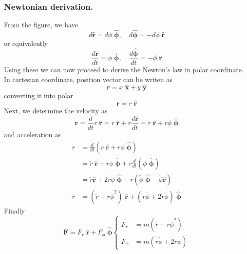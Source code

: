 \documentclass[../../../main.tex]{subfiles}
\begin{document}
\subsubsection{Newtonian derivation.}
From the figure, we have
\begin{equation*}
    d\mathbf{\hat{r}}=d\phi\;\boldsymbol{\hat{\phi}},\quad d\boldsymbol{\hat{\phi}}=-d\phi\;\mathbf{\hat{r}}
\end{equation*}
or equivalently
\begin{equation*}
    \frac{d\mathbf{\hat{r}}}{dt}=\dot{\phi}\;\boldsymbol{\hat{\phi}},\quad \frac{d\boldsymbol{\hat{\phi}}}{dt}=-\dot{\phi}\;\mathbf{\hat{r}}
\end{equation*}
Using these we can now proceed to derive the Newton's law in polar coordinate. In cartesian coordinate, position vector can be writen as
\begin{equation*}
    \mathbf{r}=x\;\mathbf{\hat{x}} + y\;\mathbf{\hat{y}}
\end{equation*}
converting it into polar
\begin{equation*}
    \mathbf{r}=r\;\mathbf{\hat{r}}
\end{equation*}
Next, we determine the velocity as
\begin{equation*}
    \mathbf{\dot{r}}=\frac{d}{dt}r\;\mathbf{\hat{r}}=\dot{r}\;\mathbf{\hat{r}} +r\frac{d\mathbf{\hat{r}}}{dt}= \dot{r}\;\mathbf{\hat{r}} +r\dot{\phi}\;\boldsymbol{\hat{\phi}}
\end{equation*}
and acceleration as
\begin{align*}
    \ddot{r} & =\frac{d}{dt}\left(\dot{r}\;\mathbf{\hat{r}} +r\dot{\phi}\;\boldsymbol{\hat{\phi}}\right)                                                              \\
             & = \ddot{r}\;\mathbf{\hat{r}}+ \dot{r}\dot{\phi}\;\boldsymbol{\hat{\phi}} +r\frac{d}{dt}\left(\dot{\phi}\;\boldsymbol{\hat{\phi}}\right)                \\
             & =\ddot{r}\mathbf{\hat{r}}+ 2\dot{r}\dot{\phi}\;\boldsymbol{\hat{\phi}}+r\left( \ddot{\phi}\;\boldsymbol{\hat{\phi}}-\dot{\phi}\mathbf{\hat{ r}}\right) \\
    \ddot{r} & = \left(\ddot{r}-r\dot{\phi}^2\right) \; \mathbf{\hat{r}} + \left(r\ddot{\phi}+2\dot{r}\dot{\phi}\right) \;\boldsymbol{ \hat{\phi}}
\end{align*}
Finally
\begin{equation*}
    \mathbf{F}=F_r\;\mathbf{\hat{r}} + F_\phi\;\boldsymbol{ \hat{\phi}}
    \begin{cases}
        F_r    & =m\left(\ddot{r}-r\dot{\phi}^2\right)          \\
        F_\phi & =m\left(r\ddot{\phi}+2\dot{r}\dot{\phi}\right)
    \end{cases}
\end{equation*}
\end{document}
